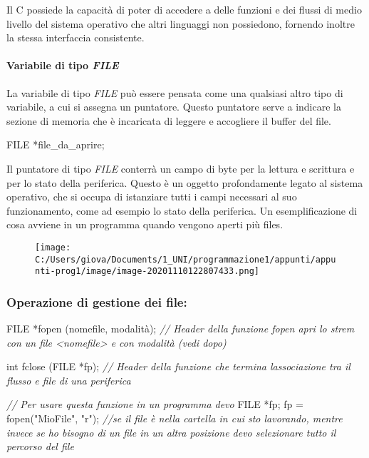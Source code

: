 \documentclass[
]{article}
\newenvironment{Shaded}{}{}
\newcommand{\CommentTok}[1]{\textcolor[rgb]{0.38,0.63,0.69}{\textit{#1}}}
\newcommand{\DataTypeTok}[1]{\textcolor[rgb]{0.56,0.13,0.00}{#1}}
\newcommand{\NormalTok}[1]{#1}
\newcommand{\StringTok}[1]{\textcolor[rgb]{0.25,0.44,0.63}{#1}}
\begin{document}
Il C possiede la capacità di poter di accedere a delle funzioni e dei
flussi di medio livello del sistema operativo che altri linguaggi non
possiedono, fornendo inoltre la stessa interfaccia consistente.

\hypertarget{header-n965}{%
\paragraph{\texorpdfstring{Variabile di tipo
\emph{FILE}}{Variabile di tipo FILE}}\label{header-n965}}

La variabile di tipo \emph{FILE} può essere pensata come una qualsiasi
altro tipo di variabile, a cui si assegna un puntatore. Questo puntatore
serve a indicare la sezione di memoria che è incaricata di leggere e
accogliere il buffer del file.

\begin{Shaded}
\begin{Highlighting}[]
\DataTypeTok{FILE}\NormalTok{ *file\_da\_aprire;}
\end{Highlighting}
\end{Shaded}

Il puntatore di tipo \emph{FILE} conterrà un campo di byte per la
lettura e scrittura e per lo stato della periferica. Questo è un oggetto
profondamente legato al sistema operativo, che si occupa di istanziare
tutti i campi necessari al suo funzionamento, come ad esempio lo stato
della periferica. Un esemplificazione di cosa avviene in un programma
quando vengono aperti più files.

\begin{figure}
\centering
\texttt{[image: C:/Users/giova/Documents/1\_UNI/programmazione1/appunti/appunti-prog1/image/image-20201110122807433.png]}
\caption{}
\end{figure}

\hypertarget{header-n971}{%
\subsubsection{Operazione di gestione dei file:}\label{header-n971}}

\begin{Shaded}
\begin{Highlighting}[]
\DataTypeTok{FILE}\NormalTok{ *fopen (nomefile, modalità);}
\CommentTok{// Header della funzione fopen apri lo strem con un file \textless{}nomefile\textgreater{} e con modalità (vedi dopo)}

\DataTypeTok{int}\NormalTok{ fclose (}\DataTypeTok{FILE}\NormalTok{ *fp);}
\CommentTok{// Header della funzione che termina l\textquotesingle{}associazione tra il flusso e file di una periferica}

\CommentTok{// Per usare questa funzione in un programma devo}
\DataTypeTok{FILE}\NormalTok{ *fp;}
\NormalTok{fp = fopen(}\StringTok{"MioFile"}\NormalTok{, }\StringTok{"r"}\NormalTok{); }
\CommentTok{//se il file è nella cartella in cui sto lavorando, mentre invece se ho bisogno di un file in un altra posizione devo selezionare tutto il percorso del file}
\end{Highlighting}
\end{Shaded}
\end{document}
